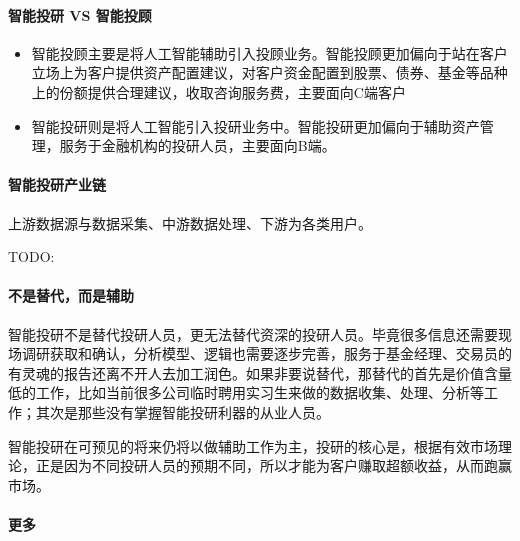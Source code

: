 \documentclass[letterpaper,11pt,english]{sphinxmanual}
\begin{document}
\begin{center}
{{\paragraph{智能投研 VS 智能投顾}
\label{\detokenize{chapter_AI+Finance/AI_Investment_Research:id5}}\begin{itemize}
\item {} 
智能投顾主要是将人工智能辅助引入投顾业务。智能投顾更加偏向于站在客户立场上为客户提供资产配置建议，对客户资金配置到股票、债券、基金等品种上的份额提供合理建议，收取咨询服务费，主要面向C端客户

\item {} 
智能投研则是将人工智能引入投研业务中。智能投研更加偏向于辅助资产管理，服务于金融机构的投研人员，主要面向B端。

\end{itemize}


\paragraph{智能投研产业链}
\label{\detokenize{chapter_AI+Finance/AI_Investment_Research:id6}}
上游数据源与数据采集、中游数据处理、下游为各类用户。

TODO:%
\begin{footnote}[966]\sphinxAtStartFootnote
{}
%
\end{footnote}


\paragraph{不是替代，而是辅助}
\label{\detokenize{chapter_AI+Finance/AI_Investment_Research:id7}}
智能投研不是替代投研人员，更无法替代资深的投研人员。毕竟很多信息还需要现场调研获取和确认，分析模型、逻辑也需要逐步完善，服务于基金经理、交易员的有灵魂的报告还离不开人去加工润色。如果非要说替代，那替代的首先是价值含量低的工作，比如当前很多公司临时聘用实习生来做的数据收集、处理、分析等工作；其次是那些没有掌握智能投研利器的从业人员。

智能投研在可预见的将来仍将以做辅助工作为主，投研的核心是，根据有效市场理论，正是因为不同投研人员的预期不同，所以才能为客户赚取超额收益，从而跑赢市场。


\paragraph{更多}
\label{\detokenize{chapter_AI+Finance/AI_Investment_Research:id8}}


}}
\end{center}
\end{document}
